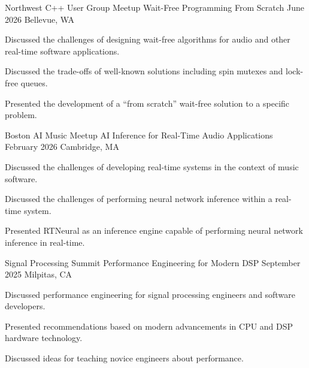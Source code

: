 

\begin{cventries}

  \cventry
    {Northwest C++ User Group Meetup} %
    {Wait-Free Programming From Scratch} %
    {June 2026} %
    {Bellevue, WA} %
    {
      \begin{cvitems} %
        \item {Discussed the challenges of designing wait-free algorithms for audio and other real-time software applications.}
        \item {Discussed the trade-offs of well-known solutions including spin mutexes and lock-free queues.}
        \item {Presented the development of a ``from scratch'' wait-free solution to a specific problem.}
      \end{cvitems}
    }

  \cventry
    {Boston AI Music Meetup} %
    {AI Inference for Real-Time Audio Applications} %
    {February 2026} %
    {Cambridge, MA} %
    {
      \begin{cvitems} %
        \item {Discussed the challenges of developing real-time systems in the context of music software.}
        \item {Discussed the challenges of performing neural network inference within a real-time system.}
        \item {Presented RTNeural as an inference engine capable of performing neural network inference in real-time.}
      \end{cvitems}
    }

  \cventry
    {Signal Processing Summit} %
    {Performance Engineering for Modern DSP} %
    {September 2025} %
    {Milpitas, CA} %
    {
      \begin{cvitems} %
        \item {Discussed performance engineering for signal processing engineers and software developers.}
        \item {Presented recommendations based on modern advancements in CPU and DSP hardware technology.}
        \item {Discussed ideas for teaching novice engineers about performance.}
      \end{cvitems}
    }


\end{cventries}
